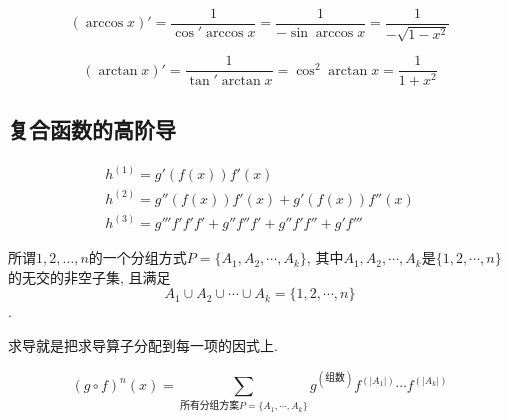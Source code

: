 \begin{example}
    \begin{equation}
      \left( \arccos x \right) ' = \frac{1}{\cos' \arccos x} = \frac{1}{- \sin \arccos x } = \frac{1}{- \sqrt{1-x^{2}}}
    \end{equation}
\end{example}

\begin{example}
    \begin{equation}
      \left( \arctan x \right) ' = \frac{1}{\tan ' \arctan x} = \cos^{2} \arctan x = \frac{1}{1 + x^{2}}
    \end{equation}
\end{example}

\subsection{复合函数的高阶导}
\begin{equation}
  \begin{gathered}
    h^{(1)} = g'\left( f\left( x \right)  \right) f'\left( x \right) \\
    h^{(2)} = g'' \left( f\left( x \right)  \right) f'\left( x \right) + g' \left( f\left( x \right)  \right) f''\left( x \right) \\
    h^{(3)} = g''' f' f' f' + g'' f'' f' + g'' f' f'' + g' f'''
  \end{gathered}
\end{equation}

\begin{definition}
    所谓$1, 2 , \ldots ,n$的一个分组方式$P = \{ A_1,A_2,\cdots,A_k \}$, 其中$A_1,A_2,\cdots,A_k$是$\{ 1,2,\cdots,n \}$的无交的非空子集, 且满足
    \begin{equation}
      A_1 \cup A_2 \cup  \cdots \cup A_k = \{ 1,2,\cdots,n \}
    \end{equation}.
\end{definition}
求导就是把求导算子分配到每一项的因式上.
\begin{theorem}
    \begin{equation}
      \left( g\circ f \right) ^{n} (x) = \sum_{\text{所有分组方案$P = \{A_1, \cdots, A_k\}$}}g^{(\text{组数})} f^{(|A_1|)} \cdots f^{(|A_k|)}
    \end{equation}
\end{theorem}